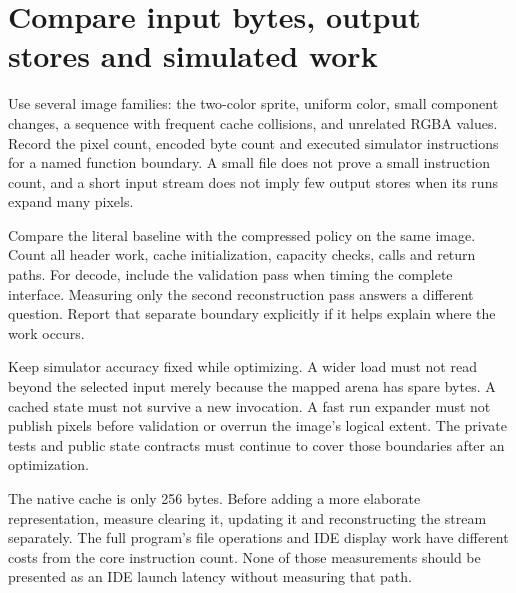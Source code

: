 \section{Compare input bytes, output stores and simulated work}
Use several image families: the two-color sprite, uniform color, small component changes,
a sequence with frequent cache collisions, and unrelated RGBA values. Record the pixel
count, encoded byte count and executed simulator instructions for a named function
boundary. A small file does not prove a small instruction count, and a short input
stream does not imply few output stores when its runs expand many pixels.

Compare the literal baseline with the compressed policy on the same image. Count all
header work, cache initialization, capacity checks, calls and return paths. For decode,
include the validation pass when timing the complete interface. Measuring only the
second reconstruction pass answers a different question. Report that separate boundary
explicitly if it helps explain where the work occurs.

Keep simulator accuracy fixed while optimizing. A wider load must not read beyond the
selected input merely because the mapped arena has spare bytes. A cached state must
not survive a new invocation. A fast run expander must not publish pixels before
validation or overrun the image's logical extent. The private tests and public state
contracts must continue to cover those boundaries after an optimization.

The native cache is only 256 bytes. Before adding a more elaborate representation,
measure clearing it, updating it and reconstructing the stream separately. The full
program's file operations and IDE display work have different costs from the core
instruction count. None of those measurements should be presented as an IDE launch
latency without measuring that path.
